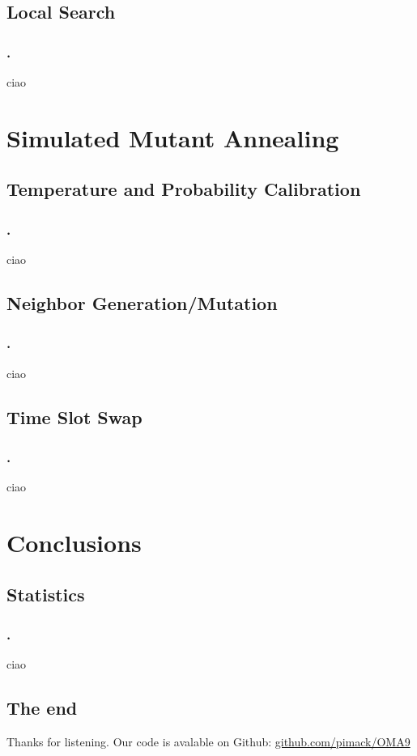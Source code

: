 \documentclass[notes]{beamer}       %
\begin{document}
   \subsection{Local Search}

	\begin{frame}
	   \frametitle{\thesection.\thesubsection \ \insertsubsection}
	ciao
	\end{frame}

\section{Simulated Mutant Annealing}

\subsection{Temperature and Probability Calibration}

\begin{frame}
\frametitle{\thesection.\thesubsection \ \insertsubsection}
ciao
\end{frame}

\subsection{Neighbor Generation/Mutation}

\begin{frame}
\frametitle{\thesection.\thesubsection \ \insertsubsection}
ciao
\end{frame}

\subsection{Time Slot Swap}

\begin{frame}
\frametitle{\thesection.\thesubsection \ \insertsubsection}
ciao
\end{frame}

\section{Conclusions}

\subsection{Statistics}

\begin{frame}
\frametitle{\thesection.\thesubsection \ \insertsubsection}
ciao
\end{frame}

\subsection{The end}

\begin{frame}
Thanks for listening.
\vfill
Our code is avalable on Github: \href{https://github.com/pimack/OMA9}{github.com/pimack/OMA9}
\end{frame}
\end{document}
